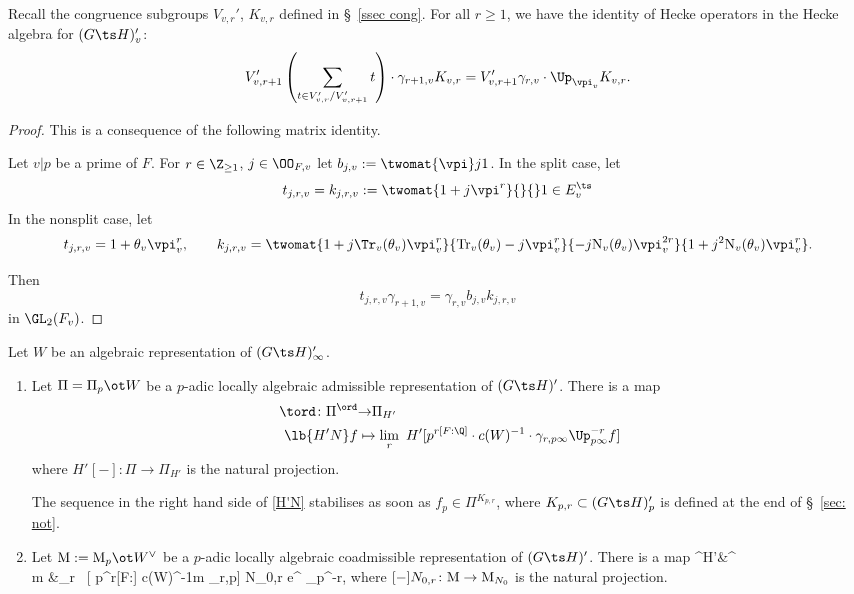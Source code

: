 \begin{lemm}
Recall the congruence subgroups $V_{v,r}'$, $K_{v,r}$ defined in \S~\ref{ssec cong}. For all $r\geq 1$, we  have the identity of Hecke operators in the Hecke algebra for $(G\ts H)'_{v}$:
$$ V_{v, r+1}'\left( \sum_{t\in V_{v,r}'/V_{v,r+1}'} t \right) \cdot
\gamma_{r+1,v}   K_{v,r}=   V_{v, r+1}' \gamma_{r,v}\cdot \Up_{\vpi_{v}}  K_{v, r}.$$
\end{lemm}
\begin{proof}
This is a consequence of   the following matrix identity.

Let $v\vert p$ be a prime of $F$.
For   $r\in \Z_{\geq 1}$, $j\in \OO_{F,v}$
 let
  $b_{j,v}:= \twomat {\vpi} j {}1$. In the split case, let
    $$ t_{j,r, v}= k_{j,r,v}:= \twomat {1+j\vpi^{r}}{}{}1\in E_{v}^{\ts}$$
 In the nonsplit case, let
 $$t_{j,r, v}=1+\theta_{v}\vpi_{v}^{r},
  \qquad
  k_{j, r, v}=\twomat {1+j{\Tr}_{v}(\theta_{v}) \vpi_{v}^{r}} {{\rm Tr}_{v}(\theta_{v})-j\vpi_{v}^{r}}
  {-j{\rm N}_{v}(\theta_{v}) \vpi_{v}^{2r}} { 1+j^{2}{\rm N}_{v}(\theta_{v} )\vpi_{v}^{r}}.
  $$

    Then
$$t_{j,r, v}\gamma_{r+1,v}=\gamma_{r,v} b_{j,v} k_{j,r, v}$$
in $\GL_{2}(F_{v})$.
\end{proof}


\begin{prop}
\notready{} Let $W$ be an algebraic representation of $(G\ts H)'_{\infty}$.
\begin{enumerate}
\item Let $\Pi=\Pi_{p}\ot W$  be a $p$-adic locally algebraic  admissible representation  of $(G\ts H)'$.
There is a map
\begin{align}
\nonumber
\tord \colon \Pi^{\ord} &{\to}  \Pi_{H'}\\
\lb{H'N}
  f  &\mapsto \lim_{r} \
    {H'_{}}[ p^{r[F:\Q]} \cdot c(W)^{-1}\cdot \gamma_{r, p\infty}  \Up_{p\infty}^{-r} f]
 \end{align}
where
  ${H'_{}}[-]\colon \Pi\to \Pi_{H'}$ is the natural projection.

 The sequence in the right hand side of \eqref{H'N} stabilises as soon as $f_{p}\in \Pi^{K_{p, r}}$, where $K_{p, r}\subset (G\ts H)_{p}'$ is  defined at the end of \S~\ref{sec: not}.
\item
Let   ${\rm M}:= {\rm M}_{p}\ot W^{\vee}$ be a $p$-adic locally algebraic  coadmissible representation of $(G\ts H)'$.
There  is a map
\beqq
\tord {}^{H'}&^{\ord}\\
m  &\mapsto \lim_{r}
\
[ p^{r[F:\Q]} \cdot  c(W)^{-1}\cdot  m
 \gamma_{r,p\infty}]
{N_{0,r}} e^{\ord} \Up_{p\infty}^{-r},
 \eeqq
 where $[ -]{N_{0,r}}\colon  {\rm M} \to {\rm M}_{N_{0}}$ is the natural projection.
\end{enumerate}
\end{prop}

